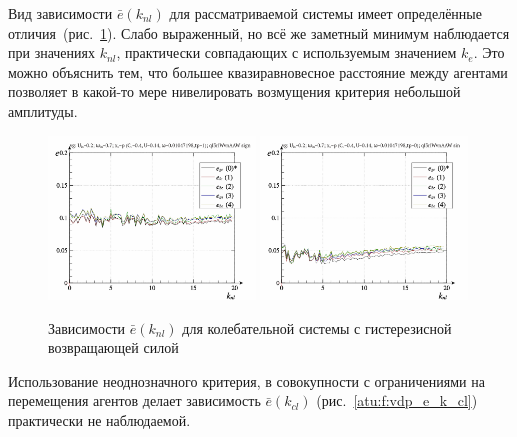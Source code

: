 Вид зависимости $\bar{e}(k_{nl})$ для рассматриваемой системы имеет определённые
отличия~(рис.~\ref{atu:f:vg_e_k_nl}).
Слабо выраженный, но всё же заметный минимум наблюдается
при значениях $k_{nl}$, практически совпадающих с используемым значением $k_e$.
Это можно объяснить тем, что большее квазиравновесное расстояние
между агентами позволяет в какой-то мере нивелировать
возмущения критерия небольшой амплитуды.

\begin{figure}[ht!]
\begin{center}
  \includegraphics[width=0.49\textwidth]{p/cha/vg/vg_id-p_k_nl_sign.png}
  \hfill
  \includegraphics[width=0.49\textwidth]{p/cha/vg/vg_id-p_k_nl_sin.png}
\end{center}
  \caption{Зависимости $\bar{e}(k_{nl})$ для колебательной системы с гистерезисной возвращающей силой}
\label{atu:f:vg_e_k_nl}
\end{figure}

Использование неоднозначного критерия,
в совокупности с ограничениями на перемещения агентов
делает зависимость $\bar{e}(k_{cl})$ (рис.~\ref{atu:f:vdp_e_k_cl})
практически не наблюдаемой.


